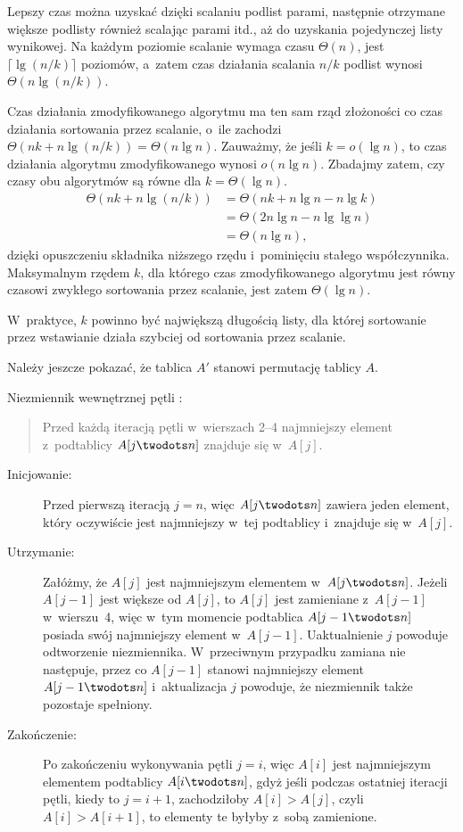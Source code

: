 Lepszy czas można uzyskać dzięki scalaniu podlist parami, następnie otrzymane większe podlisty również scalając parami itd., aż do uzyskania pojedynczej listy wynikowej. Na każdym poziomie scalanie wymaga czasu $\Theta(n)$, jest $\lceil\lg(n/k)\rceil$ poziomów, a~zatem czas działania scalania $n/k$ podlist wynosi $\Theta(n\lg(n/k))$.

\subproblem %
Czas działania zmodyfikowanego algorytmu ma ten sam rząd złożoności co czas działania sortowania przez scalanie, o~ile zachodzi $\Theta(nk+n\lg(n/k))=\Theta(n\lg n)$. Zauważmy, że jeśli $k=o(\lg n)$, to czas działania algorytmu zmodyfikowanego wynosi $o(n\lg n)$. Zbadajmy zatem, czy czasy obu algorytmów są równe dla $k=\Theta(\lg n)$.
\begin{align*}
	\Theta(nk+n\lg(n/k)) &= \Theta(nk+n\lg n-n\lg k) \\
	&= \Theta(2n\lg n-n\lg\lg n) \\
	&= \Theta(n\lg n),
\end{align*}
dzięki opuszczeniu składnika niższego rzędu i~pominięciu stałego współczynnika. Maksymalnym rzędem $k$, dla którego czas zmodyfikowanego algorytmu jest równy czasowi zwykłego sortowania przez scalanie, jest zatem $\Theta(\lg n)$.

\subproblem %
W~praktyce, $k$ powinno być największą długością listy, dla której sortowanie przez wstawianie działa szybciej od sortowania przez scalanie.


\subproblem %
Należy jeszcze pokazać, że tablica $A'$ stanowi permutację tablicy $A$.

\subproblem %
Niezmiennik wewnętrznej pętli :
\begin{quote}
Przed każdą iteracją pętli  w~wierszach 2\nobreakdash--4 najmniejszy element z~podtablicy $A[j\twodots n]$ znajduje się w~$A[j]$.
\end{quote}
\begin{description}
	\item[Inicjowanie:] Przed pierwszą iteracją $j=n$, więc $A[j\twodots n]$ zawiera jeden element, który oczywiście jest najmniejszy w~tej podtablicy i~znajduje się w~$A[j]$.
	\item[Utrzymanie:] Załóżmy, że $A[j]$ jest najmniejszym elementem w~$A[j\twodots n]$. Jeżeli $A[j-1]$ jest większe od $A[j]$, to $A[j]$ jest zamieniane z~$A[j-1]$ w~wierszu~4, więc w~tym momencie podtablica $A[j-1\twodots n]$ posiada swój najmniejszy element w~$A[j-1]$. Uaktualnienie $j$ powoduje odtworzenie niezmiennika. W~przeciwnym przypadku zamiana nie następuje, przez co $A[j-1]$ stanowi najmniejszy element $A[j-1\twodots n]$ i~aktualizacja $j$ powoduje, że niezmiennik także pozostaje spełniony.
	\item[Zakończenie:] Po zakończeniu wykonywania pętli $j=i$, więc $A[i]$ jest najmniejszym elementem podtablicy $A[i\twodots n]$, gdyż jeśli podczas ostatniej iteracji pętli, kiedy to $j=i+1$, zachodziłoby $A[i]>A[j]$, czyli $A[i]>A[i+1]$, to elementy te byłyby z~sobą zamienione.
\end{description}

